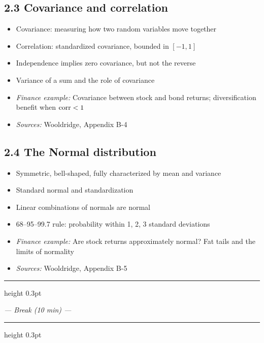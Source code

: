 \documentclass[letterpaper,10pt]{article}
\begin{document}
\subsection*{2.3 Covariance and correlation}
\begin{itemize}
    \item Covariance: measuring how two random variables move together
    \item Correlation: standardized covariance, bounded in $[-1, 1]$
    \item Independence implies zero covariance, but not the reverse
    \item Variance of a sum and the role of covariance
    \item \textit{Finance example:} Covariance between stock and bond returns; diversification benefit when $\operatorname{corr} < 1$
    \item \textit{Sources:} Wooldridge, Appendix B-4
\end{itemize}

\subsection*{2.4 The Normal distribution}
\begin{itemize}
    \item Symmetric, bell-shaped, fully characterized by mean and variance
    \item Standard normal and standardization
    \item Linear combinations of normals are normal
    \item 68--95--99.7 rule: probability within 1, 2, 3 standard deviations
    \item \textit{Finance example:} Are stock returns approximately normal? Fat tails and the limits of normality
    \item \textit{Sources:} Wooldridge, Appendix B-5
\end{itemize}


\vspace{0.5em}
\hrule height 0.3pt
\vspace{0.5em}
\begin{center}\textit{--- Break (10 min) ---}\end{center}
\vspace{0.5em}
\hrule height 0.3pt
\vspace{1em}
\end{document}
